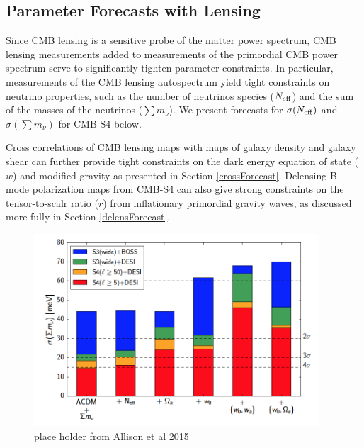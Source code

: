 




\subsection{Parameter Forecasts with Lensing}\label{forecast}

Since CMB lensing is a sensitive probe of the matter power spectrum, CMB lensing measurements added to measurements of the primordial CMB power spectrum serve to significantly tighten parameter constraints.  In particular, measurements of the CMB lensing autospectrum yield tight constraints on neutrino properties, such as the number of neutrinos species ($N_{\rm{eff}}$) and the sum of the masses of the neutrinos ($\sum {m_\nu}$).  We present forecasts for $\sigma(N_{\rm{eff}})$ and $\sigma(\sum {m_\nu})$ for CMB-S4 below.  

Cross correlations of CMB lensing maps with maps of galaxy density and galaxy shear can further provide tight constraints on the dark energy equation of state ($w$) and modified gravity as presented in Section \ref{crossForecast}.  Delensing B-mode polarization maps from CMB-S4 can also give strong constraints on the tensor-to-scalr ratio ($r$) from inflationary primordial gravity waves, as discussed more fully in Section \ref{delensForecast}.

\begin{figure}[h]
\includegraphics[width=0.95\textwidth]{CMBLensing/Allisonetal.png}
\caption{place holder from Allison et al 2015}
\label{nuForecasts}
\end{figure}

